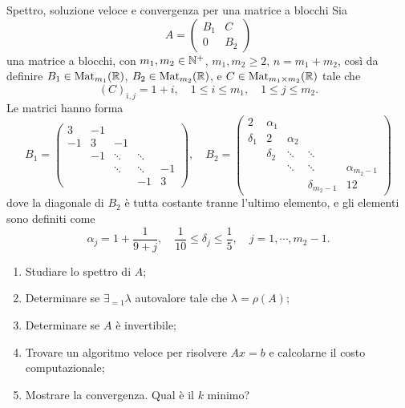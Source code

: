 \documentclass[a4paper]{article}
\begin{document}
\begin{snippetexercise}{Spettro, soluzione veloce e convergenza per una matrice a blocchi}
    Sia
    \[
        A =
        \begin{pmatrix}
            B_1 & C \\
            0 & B_2
        \end{pmatrix}
    \]
    una matrice a blocchi, con \(m_1, m_2 \in \mathbb{N}^+\), \(m_1, m_2 \geq 2\),
    \(n=m_1+m_2\), così da definire
    \(B_1 \in \operatorname{Mat}_{m_1}(\mathbb{R})\),
    \(B_2 \in \operatorname{Mat}_{m_2}(\mathbb{R})\), e
    \(C \in \operatorname{Mat}_{m_1 \times m_2}(\mathbb{R})\) tale che
    \[
        (C)_{i,j} = 1 + i, \quad 1 \leq i \leq m_1, \quad 1 \leq j \leq m_2.
    \]
    Le matrici hanno forma
    \[
        B_1 =
        \begin{pmatrix}
            3 & -1 & & & \\
            -1 & 3 & -1 & & \\
            & -1 & \ddots & \ddots & \\
            & & \ddots & \ddots & -1 \\
            & & & -1 & 3
        \end{pmatrix}, \quad
        B_2 =
        \begin{pmatrix}
            2 & \alpha_{1} & & & \\
            \delta_1 & 2 & \alpha_{2} & & \\
            & \delta_2 & \ddots & \ddots &  \\
            & & \ddots & \ddots & \alpha_{m_2-1} \\
            & & & \delta_{m_2-1} & 12
        \end{pmatrix}
    \]
    dove la diagonale di \(B_2\) è tutta costante tranne l'ultimo elemento, e gli elementi sono definiti come
    \[
        \alpha_j = 1 + \frac{1}{9 + j}, \quad
        \frac{1}{10} \leq \delta_j \leq \frac15, \quad j=1,\cdots,m_2-1.
    \]
    \begin{enumerate}
        \item Studiare lo spettro di \(A\);
        \item Determinare se \(\exists_{=1} \lambda\) autovalore tale che \(\lambda = \rho(A)\);
        \item Determinare se \(A\) è invertibile;
        \item Trovare un algoritmo veloce per risolvere \(Ax=b\) e calcolarne il costo computazionale;
        \item Mostrare la convergenza. Qual è il \(k\) minimo?
    \end{enumerate}
\end{snippetexercise}
\end{document}
